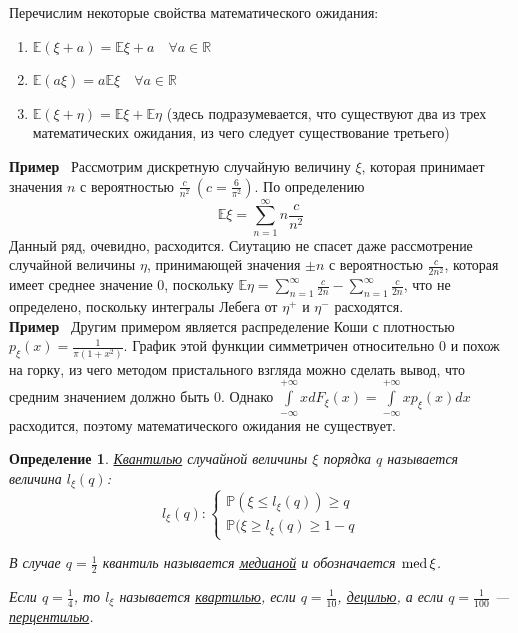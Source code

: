\documentclass[12pt]{article}
\newtheorem{Def}{Определение}
\newenvironment{Ex}{{\bf Пример}\ }{}
\numberwithin{Th}{section}
\numberwithin{Def}{section}
\numberwithin{Lem}{section}
\numberwithin{St}{section}
\numberwithin{equation}{section}
\newcommand\Pro{\mathbb{P}} %
\newcommand\Real{\mathbb{R}} %
\newcommand\Expec{\mathbb{E}} %
\newcommand\Med{{\rm med \,}} %
\begin{document}
Перечислим некоторые свойства математического ожидания:
\begin{enumerate}
	\item $\Expec(\xi + a) = \Expec\xi + a \quad \forall a \in \Real$
	\item $\Expec(a\xi) = a\Expec\xi \quad \forall a \in \Real$
	\item $\Expec(\xi + \eta) = \Expec\xi + \Expec\eta$ (здесь подразумевается, что существуют два из трех математических ожидания, из чего следует существование третьего)
\end{enumerate}
\begin{Ex}
Рассмотрим дискретную случайную величину $\xi$, которая принимает значения $n$ с вероятностью $\frac{c}{n^2} \ (c = \frac{6}{\pi^2})$. По определению
$$ \Expec\xi = \sum\limits_{n=1}^{\infty} n \frac{c}{n^2} $$
Данный ряд, очевидно, расходится. Сиутацию не спасет даже рассмотрение случайной величины $\eta$, принимающей значения $\pm n$ с вероятностью $\frac{c}{2n^2}$, 
которая имеет среднее значение 0, 
поскольку $\Expec\eta = \sum\limits_{n=1}^{\infty} \frac{c}{2n} - \sum\limits_{n=1}^{\infty} \frac{c}{2n}$, что не определено, поскольку интегралы Лебега от $\eta^+$ и $\eta^-$ расходятся.\\
\end{Ex}
\begin{Ex}
Другим примером является распределение Коши с плотностью $p_\xi(x) = \frac{1}{\pi(1+x^2)}$. График этой функции симметричен относительно 0 и похож на горку, из чего
методом пристального взгляда можно сделать вывод, что средним значением должно быть 0. Однако  $
\int\limits_{-\infty}^{+\infty} x dF_\xi(x) =  \int\limits_{-\infty}^{+\infty} x p_\xi(x)dx$ расходится, поэтому математического ожидания не существует.
\end{Ex}

\begin{Def}
\underline{Квантилью} случайной величины $\xi$ порядка $q$ называется величина $l_\xi(q)$:
\[
   	l_\xi(q) \colon 
  	\begin{cases}
  		\Pro(\xi \le l_\xi(q)) \ge q \\
  		\Pro(\xi \ge l_\xi(q) \ge 1-q
  	\end{cases}
  \]
  
  В случае $q=\frac12$ квантиль называется \underline{медианой} и обозначается $\Med\xi$.
  
  Если $q=\frac14$, то $l_\xi$ называется \underline{квартилью}, если $q=\frac1{10}$, \underline{децилью}, а если $q=\frac{1}{100}$ --- \underline{перцентилью}.
\end{Def}
\end{document}
